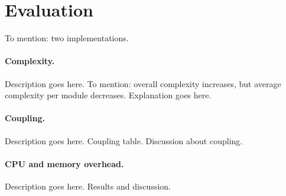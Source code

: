 \section{Evaluation}
To mention: two implementations.

\paragraph{Complexity.} Description goes here. To mention: overall complexity increases, but average complexity per module decreases. Explanation goes here.

\paragraph{Coupling.} Description goes here. Coupling table. Discussion about coupling.

\paragraph{CPU and memory overhead.} Description goes here. Results and discussion.